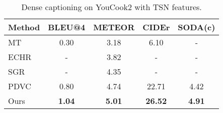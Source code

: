 \begin{table}[t]
\caption{Dense captioning on YouCook2 with TSN features.}
\vspace{-0.6em}
\small
\renewcommand\arraystretch{0.9}
       \centering
        \makeatletter{}\makeatother
        \setlength{\tabcolsep}{2.2 mm}
        {
        \begin{tabular}{lcccc}
            \toprule
            \multirow{1}{*}{Method}  & BLEU@4 & \multirow{1}{*}{METEOR} & CIDEr & \multirow{1}{*}{SODA(c)} \\
            \midrule
            MT~\cite{zhou2018end} & 0.30 & 3.18  & 6.10 & - \\
            ECHR~\cite{wang2020event} & - & 3.82 & - & -\\
            SGR~\cite{deng2021sketch} & - & 4.35 & - & - \\
            {PDVC~\cite{wang2021end}} & 0.80 & {4.74}  & 22.71 & {4.42} \\
            \rowcolor{Gray}          
            {{Ours}} & \textbf{1.04} & \textbf{5.01} & \textbf{26.52} & \textbf{4.91} \\            
            \bottomrule
        \end{tabular}}
        \label{table:SotaYC}
        \vspace{-1.0em}
\end{table}

